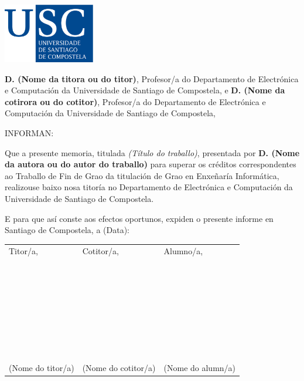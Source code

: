 \pagestyle{plain}
\includegraphics[width=4cm]{figuras/logo_usc.eps}

\vspace{1cm}
{\bf D. (Nome da titora ou do titor)}, Profesor/a do Departamento de Electrónica e Computación da Universidade de Santiago de Compostela, e {\bf D. (Nome da cotirora ou do cotitor)}, Profesor/a do Departamento de Electrónica e Computación da Universidade de Santiago de Compostela,

\vspace{1cm}
INFORMAN:

\vspace{1cm}
Que a presente memoria, titulada {\it (Título do traballo)}, presentada por {\bf D. (Nome da autora ou do autor do traballo)} para superar os créditos correspondentes ao Traballo de Fin de Grao da titulación de Grao en Enxeñaría Informática, realizouse baixo nosa titoría no Departamento de Electrónica e Computación da Universidade de Santiago de Compostela.

\vspace{1cm}
E para que así conste aos efectos oportunos, expiden o presente informe en Santiago de Compostela, a (Data):

\vspace{2cm}
\begin{tabular}{lll}
	Titor/a, & Cotitor/a, & Alumno/a, \\
	~ \\
	~ \\
	~ \\
	~ \\
	~ \\
	~ \\
	~ \\
	(Nome do titor/a) & (Nome do cotitor/a) & (Nome do alumn/a)
\end{tabular}

